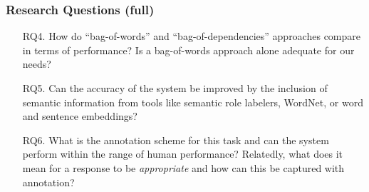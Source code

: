 \documentclass[handout,xcolor={dvipsnames}]{beamer}
\begin{document}
\begin{frame}
\frametitle{Research Questions (full)}
\small
\begin{itemize}
\pause
\item[RQ4.]{How do ``bag-of-words'' and ``bag-of-dependencies'' approaches compare in terms of performance? Is a bag-of-words approach alone adequate for our needs?}
\pause
\vspace{2em}
\item[RQ5.]{Can the accuracy of the system be improved by the inclusion of semantic information from tools like semantic role labelers, WordNet, or word and sentence embeddings?}

\pause
\vspace{2em}
\item[RQ6.]{What is the annotation scheme for this task and can the system perform within the range of human performance? Relatedly, what does it mean for a response to be \textit{appropriate} and how can this be captured with annotation?}
\end{itemize}
\end{frame}
\end{document}
